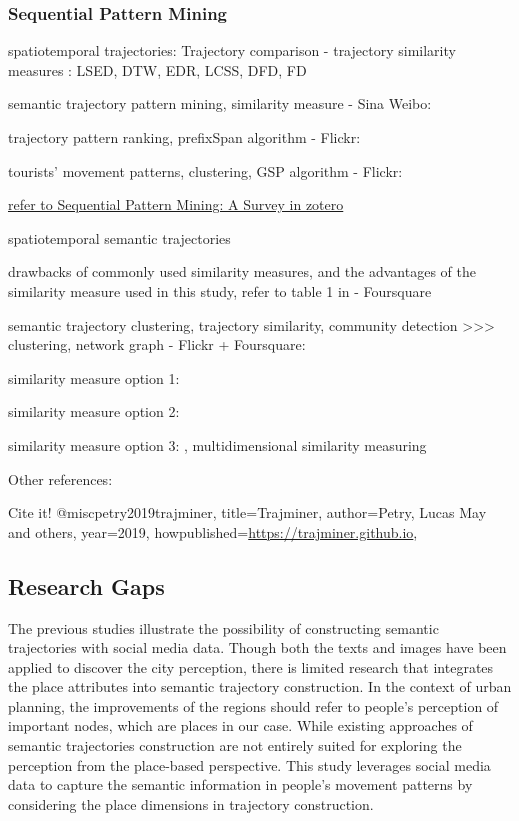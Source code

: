 \documentclass{article}
\begin{document}
\subsubsection{Sequential Pattern Mining}

spatiotemporal trajectories:
Trajectory comparison - trajectory similarity measures \cite{tao_comparative_2021}: LSED, DTW, EDR, LCSS, DFD, FD

semantic trajectory pattern mining, similarity measure - Sina Weibo: \cite{wan_semantic-geographic_2017}

trajectory pattern ranking, prefixSpan algorithm - Flickr:  \cite{yin_diversified_2011}

tourists' movement patterns, clustering, GSP algorithm - Flickr: \cite{hopken_flickr_2020}

\underline{refer to Sequential Pattern Mining: A Survey in zotero}

spatiotemporal semantic trajectories

drawbacks of commonly used similarity measures, and the advantages of the similarity measure used in this study, refer to table 1 in \cite{petry_towards_2019} - Foursquare

semantic trajectory clustering, trajectory similarity, community detection >>> clustering, network graph - Flickr + Foursquare: \cite{liu_stccd_2020}

similarity measure option 1:
\cite{petry_towards_2019}

similarity measure option 2:
\cite{ferrero_mastermovelets_2020}

similarity measure option 3:
\cite{furtado_multidimensional_2016}, multidimensional similarity measuring

Other references:
\cite{xiao_inferring_2014}

Cite it!
@misc{petry2019trajminer,
  title={Trajminer},
  author={Petry, Lucas May and others},
  year={2019},
  howpublished={\url{https://trajminer.github.io}},
}


\subsection{Research Gaps}
The previous studies illustrate the possibility of constructing semantic trajectories with social media data. Though both the texts and images have been applied to discover the city perception, there is limited research that integrates the place attributes into semantic trajectory construction. In the context of urban planning, the improvements of the regions should refer to people’s perception of important nodes, which are places in our case. While existing approaches of semantic trajectories construction are not entirely suited for exploring the perception from the place-based perspective. This study leverages social media data to capture the semantic information in people’s movement patterns by considering the place dimensions in trajectory construction.
\newpage
\end{document}

